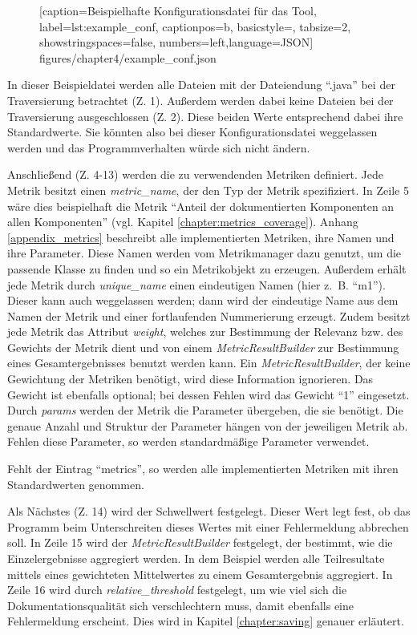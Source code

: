 \begin{figure}

[caption={Beispielhafte Konfigurationsdatei für das Tool},
label={lst:example_conf},
captionpos=b, basicstyle=\footnotesize, tabsize=2, showstringspaces=false,  numbers=left,language=JSON]
{figures/chapter4/example_conf.json}
\end{figure}

In dieser Beispieldatei  werden alle Dateien mit der Dateiendung \enquote{.java} bei der Traversierung betrachtet (Z. 1). Außerdem werden dabei keine Dateien bei der Traversierung ausgeschlossen (Z. 2). Diese beiden Werte entsprechend dabei ihre Standardwerte. Sie könnten also bei dieser Konfigurationsdatei weggelassen werden und das Programmverhalten würde sich nicht ändern.

Anschließend (Z. 4-13) werden die zu verwendenden Metriken definiert. Jede Metrik besitzt einen \textit{metric\_name}, der den Typ der Metrik spezifiziert. In Zeile 5 wäre dies beispielhaft die Metrik \enquote{Anteil der dokumentierten Komponenten an allen Komponenten} (vgl. Kapitel \ref{chapter:metrics_coverage}). Anhang  \ref{appendix_metrics} beschreibt alle implementierten Metriken, ihre Namen und ihre Parameter. Diese Namen werden vom Metrikmanager dazu genutzt, um die passende Klasse zu finden und so ein Metrikobjekt zu erzeugen. Außerdem erhält jede Metrik durch \textit{unique\_name} einen eindeutigen Namen (hier z.~B. \enquote{m1}). Dieser kann auch weggelassen werden; dann wird der eindeutige Name aus dem Namen der Metrik und einer fortlaufenden Nummerierung erzeugt. Zudem besitzt jede Metrik das Attribut \textit{weight}, welches zur Bestimmung der Relevanz bzw. des Gewichts der Metrik dient und von einem \textit{MetricResultBuilder} zur Bestimmung eines Gesamtergebnisses benutzt werden kann. Ein \textit{MetricResultBuilder}, der keine Gewichtung der Metriken benötigt, wird diese Information ignorieren. Das Gewicht ist ebenfalls optional; bei dessen Fehlen wird das Gewicht \enquote{1} eingesetzt.  Durch \textit{params}  werden der Metrik die Parameter übergeben, die sie benötigt. Die genaue Anzahl und Struktur der Parameter hängen von der jeweiligen Metrik ab. Fehlen diese Parameter, so werden standardmäßige Parameter verwendet.

Fehlt der Eintrag \enquote{metrics}, so werden alle implementierten Metriken mit ihren Standardwerten genommen.

Als Nächstes (Z. 14) wird der Schwellwert festgelegt. Dieser Wert legt fest, ob das Programm beim Unterschreiten dieses Wertes mit einer Fehlermeldung abbrechen soll. In Zeile 15 wird der \textit{MetricResultBuilder} festgelegt, der bestimmt, wie die Einzelergebnisse aggregiert werden. In dem Beispiel werden alle Teilresultate mittels eines gewichteten Mittelwertes zu einem Gesamtergebnis aggregiert.  In Zeile 16 wird durch \textit{ relative\_threshold } festgelegt, um wie viel sich die Dokumentationsqualität sich verschlechtern muss, damit ebenfalls eine Fehlermeldung erscheint. Dies wird in Kapitel \ref{chapter:saving} genauer erläutert.



